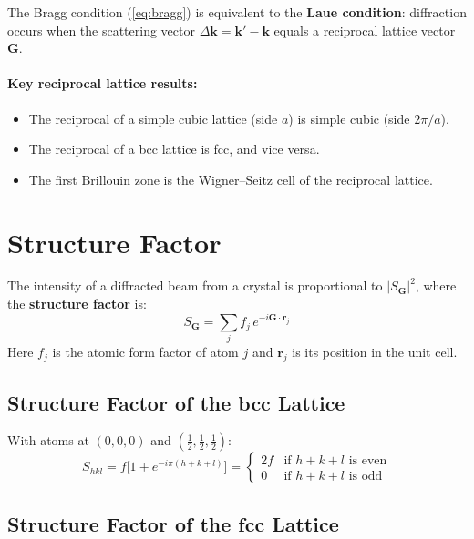 The Bragg condition (\ref{eq:bragg}) is equivalent to the \textbf{Laue condition}: diffraction occurs when the scattering vector $\Delta\mathbf{k} = \mathbf{k}' - \mathbf{k}$ equals a reciprocal lattice vector $\mathbf{G}$.

\paragraph{Key reciprocal lattice results:}
\begin{itemize}[nosep]
  \item The reciprocal of a simple cubic lattice (side $a$) is simple cubic (side $2\pi/a$).
  \item The reciprocal of a bcc lattice is fcc, and vice versa.
  \item The first Brillouin zone is the Wigner--Seitz cell of the reciprocal lattice.
\end{itemize}

\section{Structure Factor}

The intensity of a diffracted beam from a crystal is proportional to $|S_{\mathbf{G}}|^2$, where the \textbf{structure factor} is:
\begin{equation}
  S_{\mathbf{G}} = \sum_{j} f_j \, e^{-i\mathbf{G} \cdot \mathbf{r}_j}
\end{equation}
Here $f_j$ is the atomic form factor of atom $j$ and $\mathbf{r}_j$ is its position in the unit cell.

\subsection{Structure Factor of the bcc Lattice}

With atoms at $(0,0,0)$ and $(\tfrac{1}{2},\tfrac{1}{2},\tfrac{1}{2})$:
\begin{equation}
  S_{hkl} = f\bigl[1 + e^{-i\pi(h+k+l)}\bigr] =
  \begin{cases}
    2f & \text{if } h+k+l \text{ is even} \\
    0  & \text{if } h+k+l \text{ is odd}
  \end{cases}
\end{equation}

\subsection{Structure Factor of the fcc Lattice}

